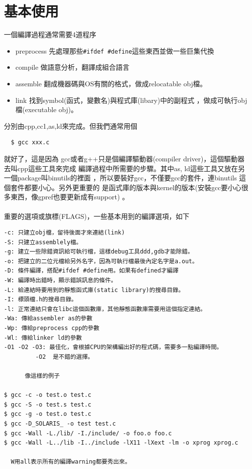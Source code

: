   \section{基本使用}
  一個編譯過程通常需要4道程序
  \begin{itemize}
    \item preprocess	先處理那些\verb=#ifdef #define=這些東西並做一些巨集代換
    \item compile	做語意分析，翻譯成組合語言
    \item assemble	翻成機器碼與OS有關的格式，做成relocatable obj檔。
    \item link  	找到symbol(函式，變數名)與程式庫(libary)中的副程式
                        ，做成可執行obj檔(executable obj)。
  \end{itemize}
  分別由cpp,cc1,as,ld來完成。但我們通常用個
  \begin{verbatim}
  $ gcc xxx.c
  \end{verbatim}
  就好了，這是因為
  gcc或者g++只是個編譯驅動器(compiler driver)，這個驅動器去叫cpp這些工具來完成
  編譯過程中所需要的步驟。其中as, ld這些工具又放在另一個package叫binutils的裡面
  ，所以要裝好gcc，不僅要gcc的套件，連binutils 這個套件都要小心。另外更重要的
  是函式庫的版本與kernel的版本(安裝gcc要小心很多東西，像gpref也要更新成有support)
  。\\\\
  重要的選項或旗標(FLAGS)，一些基本用到的編譯選項，如下
  \begin{verbatim}
-c: 只建立obj檔，留待後面才來連結(link)
-S: 只建立assemblely檔。
-g: 建立一些除錯資訊給可執行檔，這樣debug工具ddd,gdb才能除錯。
-o: 把建立的二位元檔給另外名字，因為可執行檔最後內定名字是a.out。
-D: 條件編譯，搭配#ifdef #define用。如果有defined才編譯
-W: 編譯時出錯時，顯示錯誤訊息的條件。
-L: 給連結時要用到的靜態函式庫(static library)的搜尋目錄。
-I: 標頭檔.h的搜尋目錄。
-l: 正常連結只會在libc這個函數庫，其他靜態函數庫需要用這個指定連結。
-Wa: 傳給assembler as的參數
-Wp: 傳給preprocess cpp的參數
-Wl: 傳給linker ld的參數
-O1 -O2 -O3: 最佳化，會根據CPU的架構編出好的程式碼，需要多一點編譯時間。
	     -O2  是不錯的選擇。

      像這樣的例子
      
$ gcc -c -o test.o test.c
$ gcc -S -o test.s test.c
$ gcc -g -o test.o test.c
$ gcc -D_SOLARIS_ -o test test.c
$ gcc -Wall -L./lib/ -I./include/ -o foo.o foo.c
$ gcc -Wall -L../lib -I../include -lX11 -lXext -lm -o xprog xprog.c

  W用all表示所有的編譯warning都要秀出來。
  \end{verbatim}

